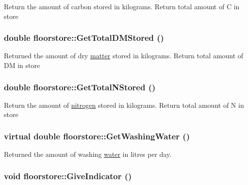 Return the amount of carbon stored in kilograms. Return total amount of C in store \hypertarget{classfloorstore_a70c102d9fd6b4c562075531fea3b520e}{
\subsubsection[{GetTotalDMStored}]{\setlength{\rightskip}{0pt plus 5cm}double floorstore::GetTotalDMStored ()}}
\label{classfloorstore_a70c102d9fd6b4c562075531fea3b520e}


Returned the amount of dry \hyperlink{classmatter}{matter} stored in kilograms. Return total amount of DM in store \hypertarget{classfloorstore_a62fa4a2efc876c2500010395619fbd5d}{
\subsubsection[{GetTotalNStored}]{\setlength{\rightskip}{0pt plus 5cm}double floorstore::GetTotalNStored ()}}
\label{classfloorstore_a62fa4a2efc876c2500010395619fbd5d}


Return the amount of \hyperlink{classnitrogen}{nitrogen} stored in kilograms. Return total amount of N in store \hypertarget{classfloorstore_a5b13ea82d1f8662ac8b117574cb24e6d}{
\subsubsection[{GetWashingWater}]{\setlength{\rightskip}{0pt plus 5cm}virtual double floorstore::GetWashingWater ()}}
\label{classfloorstore_a5b13ea82d1f8662ac8b117574cb24e6d}


Returned the amount of washing \hyperlink{classwater}{water} in litres per day. \hypertarget{classfloorstore_aef2345c78fe8a0c36209d53678fba90c}{
\subsubsection[{GiveIndicator}]{\setlength{\rightskip}{0pt plus 5cm}void floorstore::GiveIndicator ()}}
\label{classfloorstore_aef2345c78fe8a0c36209d53678fba90c}


